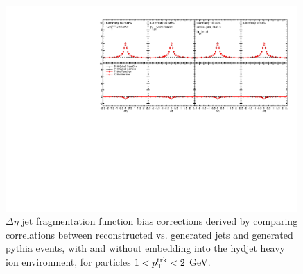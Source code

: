           \begin{figure}[hbtp]
          \begin{center}\includegraphics[width=0.99\textwidth]{figures/JFF_SpillOver/JFF_Residual_Corrections_Eta_Inclusive_TrkPt1_TrkPt2.pdf}
          \caption[Jet fragmentation function bias corrections for particles with $1<p_{\rm T}^{\rm trk}<2$ GeV]{$\Delta\eta$ jet fragmentation function bias corrections derived by comparing correlations between reconstructed vs. generated jets and generated {\sc pythia} events, with and without embedding into the {\sc hydjet} heavy ion environment, for particles $1<p_{\rm T}^{\rm trk}<2$ GeV.}
            \label{fig:jff_residual_inclusive_trkpt1_trkpt2}
            \end{center}
            \end{figure}
            
